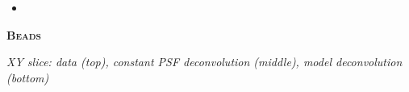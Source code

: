 \documentclass[a0paper,portrait,fontscale=0.35]{baposter}
\newcommand{\mycaption}[1]{
  {
    \smaller
    \emph{#1}
  }
}
\theoremstyle{plain}
\theoremstyle{plain}
\theoremstyle{definition}
\theoremstyle{plain}
\theoremstyle{definition}
\begin{document}
\begin{poster}
{\begin{minipage}[t]{0.33\textwidth}
\begin{itemize}
      \item
    \end{itemize}

  \end{minipage}
  \begin{minipage}[t]{0.33\textwidth} 
    \begin{center}
      \larger
      \textbf{\textsc{Beads}}
    \end{center}

    \vspace{-0.5em}
    \centering
    \begin{minipage}[t]{0.85\textwidth}
      \centering

      \vspace{-1em}
      \begin{center}
        \mycaption{
          XY slice: 
          data (top), constant PSF deconvolution (middle),
          model deconvolution (bottom)
        }
      \end{center}


\end{minipage}
\end{minipage}}
\end{poster}
\end{document}
